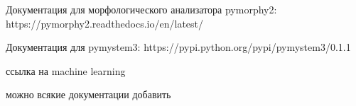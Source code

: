 \documentclass[a4paper]{report}
\begin{document}
\begin{thebibliography}{9}
		Документация для морфологического анализатора pymorphy2: https://pymorphy2.readthedocs.io/en/latest/
	
	
		Документация для pymystem3: https://pypi.python.org/pypi/pymystem3/0.1.1
		
		ссылка на machine learning
		
		можно всякие документации добавить

	
		
		

		
		
		
		
		
		
		
		
		
		
		

\end{thebibliography}
\end{document}
